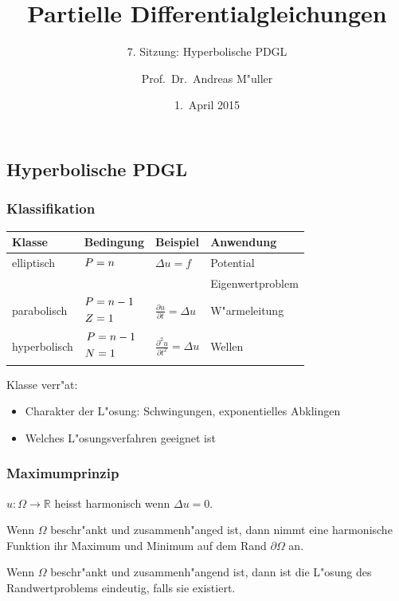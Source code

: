 \documentclass{beamer}
\title[]{Partielle Differentialgleichungen}
\subtitle{7. Sitzung: Hyperbolische PDGL}
\date[1.~April 2015]{1.~April 2015}
\author{Prof.~Dr.~Andreas M"uller}
\begin{document}
\begin{frame}
\section{Hyperbolische PDGL}
\titlepage
\end{frame}

\begin{frame}
\frametitle{Klassifikation}

\begin{center}
\begin{tabular}{llll}
Klasse&Bedingung&Beispiel&Anwendung\\
\hline
elliptisch &$\begin{aligned}P&=n\mathstrut\end{aligned}$
	&$\displaystyle \Delta u=f                                $
		&Potential\\
&	&	&Eigenwertproblem\\
\hline
parabolisch&%
$\begin{aligned}P&=n-1\mathstrut\\Z&=1\mathstrut\end{aligned}$
	&$\displaystyle \frac{\partial u}{\partial t}=\Delta u    $
		&W"armeleitung\\
\hline
hyperbolisch&%
$\begin{aligned}P&=n-1\mathstrut\\N&=1\mathstrut\end{aligned}$
	&$\displaystyle \frac{\partial^2 u}{\partial t^2}=\Delta u$
		&Wellen\\
\hline
\end{tabular}
\end{center}

Klasse verr"at:
\begin{itemize}
\item Charakter der L"osung: Schwingungen, exponentielles Abklingen
\item Welches L"osungsverfahren geeignet ist
\end{itemize}

\end{frame}

\begin{frame}
\frametitle{Maximumprinzip}
\begin{definition}
$u\colon\Omega\to\mathbb R$ heisst harmonisch wenn $\Delta u=0$.
\end{definition}

\begin{theorem}
Wenn $\Omega$ beschr"ankt und zusammenh"anged ist, dann nimmt eine
harmonische Funktion ihr Maximum und Minimum auf dem Rand $\partial\Omega$ an.
\end{theorem}

\begin{theorem}
Wenn $\Omega$ beschr"ankt und zusammenh"angend ist, dann ist die 
L"osung des Randwertproblems eindeutig, falls sie existiert.
\end{theorem}

\end{frame}
\end{document}
